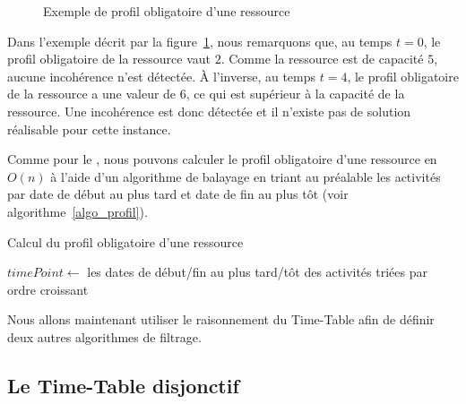 \begin{ex}
  \begin{figure}[!htb]
    \centering
    \caption{Exemple de profil obligatoire d'une ressource}
    \label{fig_profil_CECSP}
  \end{figure}
  Dans l'exemple décrit par la figure~\ref{fig_profil_CECSP}, nous
  remarquons que, au temps $t=0$, le profil obligatoire de la
  ressource vaut $2$. Comme la ressource est de capacité $5$, aucune
  incohérence n'est détectée. À l'inverse, au temps $t=4$, le profil
  obligatoire de la ressource a une valeur de $6$, ce qui est
  supérieur à la capacité de la ressource. Une incohérence est donc
  détectée et il n'existe pas de solution réalisable pour cette
  instance. 
\end{ex}


Comme pour le \CUSP, nous pouvons calculer le profil obligatoire d'une
ressource en $O(n)$ à l'aide d'un algorithme de balayage en triant au
préalable les activités par date de début au plus tard et date de fin
au plus tôt (voir algorithme~\ref{algo_profil}).

\begin{algorithm}[!htb]
  \caption{Calcul du profil obligatoire d'une ressource}
  \label{algo_profil}
  $timePoint \gets$ les dates de début/fin au plus tard/tôt
  des activités triées par ordre croissant
\end{algorithm}

Nous allons maintenant utiliser le raisonnement du Time-Table afin de
définir deux autres algorithmes de filtrage.

\subsection{Le Time-Table disjonctif}

